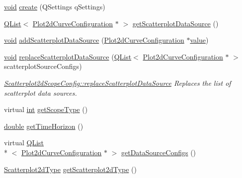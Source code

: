 \begin{DoxyCompactItemize}
\hyperlink{group___u_a_v_objects_plugin_ga444cf2ff3f0ecbe028adce838d373f5c}{void} \hyperlink{group___scope_plugin_ga5b5afb4928f9ea75b7606be6a4138a3d}{create} (Q\-Settings q\-Settings)
\item 
\hyperlink{class_q_list}{Q\-List}$<$ \hyperlink{struct_plot2d_curve_configuration}{Plot2d\-Curve\-Configuration} $\ast$ $>$ \hyperlink{group___scope_plugin_ga56246d3456c2ccf8cc5a851d3fd956f4}{get\-Scatterplot\-Data\-Source} ()
\item 
\hyperlink{group___u_a_v_objects_plugin_ga444cf2ff3f0ecbe028adce838d373f5c}{void} \hyperlink{group___scope_plugin_gac77a97364a3c7dc1e41da11bd400c551}{add\-Scatterplot\-Data\-Source} (\hyperlink{struct_plot2d_curve_configuration}{Plot2d\-Curve\-Configuration} $\ast$\hyperlink{glext_8h_aa0e2e9cea7f208d28acda0480144beb0}{value})
\item 
\hyperlink{group___u_a_v_objects_plugin_ga444cf2ff3f0ecbe028adce838d373f5c}{void} \hyperlink{group___scope_plugin_ga9fa344bf8a33a2d154be6922d8cc7915}{replace\-Scatterplot\-Data\-Source} (\hyperlink{class_q_list}{Q\-List}$<$ \hyperlink{struct_plot2d_curve_configuration}{Plot2d\-Curve\-Configuration} $\ast$ $>$ scatterplot\-Source\-Configs)
\begin{DoxyCompactList}\small\item\em \hyperlink{group___scope_plugin_ga9fa344bf8a33a2d154be6922d8cc7915}{Scatterplot2d\-Scope\-Config\-::replace\-Scatterplot\-Data\-Source} Replaces the list of scatterplot data sources. \end{DoxyCompactList}\item 
virtual \hyperlink{ioapi_8h_a787fa3cf048117ba7123753c1e74fcd6}{int} \hyperlink{group___scope_plugin_gaca53d526ca13b2be6f8e11ea754929a7}{get\-Scope\-Type} ()
\item 
\hyperlink{_super_l_u_support_8h_a8956b2b9f49bf918deed98379d159ca7}{double} \hyperlink{group___scope_plugin_ga66b9fcd762689ee3c5692552de87d7d1}{get\-Time\-Horizon} ()
\item 
virtual \hyperlink{class_q_list}{Q\-List}\\*
$<$ \hyperlink{struct_plot2d_curve_configuration}{Plot2d\-Curve\-Configuration} $\ast$ $>$ \hyperlink{group___scope_plugin_ga7ca2caad5fa0ed638d0681c5d3270241}{get\-Data\-Source\-Configs} ()
\item 
\hyperlink{group___scope_plugin_gac3cffd2a84d02f4ebfba6df970d03e97}{Scatterplot2d\-Type} \hyperlink{group___scope_plugin_ga09fc23adf2e2a28804bcf775ea00057c}{get\-Scatterplot2d\-Type} ()
\item 

\end{DoxyCompactItemize}
